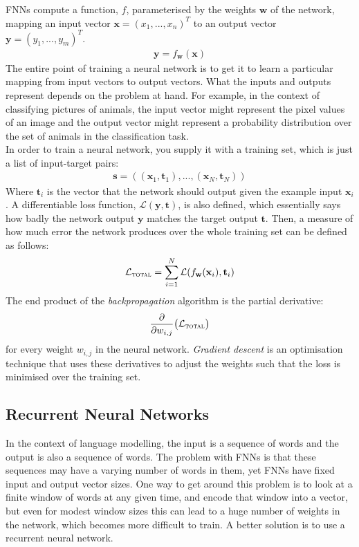 \documentclass[a4paper, 12pt]{report}
\newcommand{\tit}[1]{\textit{#1}}
\begin{document}
FNNs compute a function, $f$, parameterised by the weights $\mathbf{w}$ of the network, mapping an input vector $\mathbf{x} = (x_1, ..., x_n)^T$ to an output vector $\mathbf{y} = (y_1, ..., y_m)^T$. 
\begin{gather*}
	\mathbf{y} = f_\mathbf{w}(\mathbf{x})
\end{gather*}
The entire point of training a neural network is to get it to learn a particular mapping from input vectors to output vectors. What the inputs and outputs represent depends on the problem at hand. For example, in the context of classifying pictures of animals, the input vector might represent the pixel values of an image and the output vector might represent a probability distribution over the set of animals in the classification task. \\

In order to train a neural network, you supply it with a training set, which is just a list of input-target pairs:
\begin{gather*}
	\mathbf{s} = ((\mathbf{x}_1, \mathbf{t}_1), ..., (\mathbf{x}_N, \mathbf{t}_N))
\end{gather*}
Where $\mathbf{t}_i$ is the vector that the network should output given the example input $\mathbf{x}_i$. A differentiable loss function, $\mathcal{L}(\mathbf{y}, \mathbf{t})$, is also defined, which essentially says how badly the network output $\mathbf{y}$ matches the target output $\mathbf{t}$. Then, a measure of how much error the network produces over the whole training set can be defined as follows:
\begin{gather*}
	\mathcal{L}_{\text{\scshape total}} = \sum_{i = 1}^N \mathcal{L}(f_{\mathbf{w}}(\mathbf{x}_i), \mathbf{t}_i)
\end{gather*}
The end product of the \tit{backpropagation} algorithm is the partial derivative:
\begin{gather*}
	\frac{\partial}{\partial w_{i,j}} \big( \mathcal{L}_{\text{\scshape total}} \big)
\end{gather*}
for every weight $w_{i,j}$ in the neural network. \tit{Gradient descent} is an optimisation technique that uses these derivatives to adjust the weights such that the loss is minimised over the training set.

\subsection{Recurrent Neural Networks}

In the context of language modelling, the input is a sequence of words and the output is also a sequence of words. The problem with FNNs is that these sequences may have a varying number of words in them, yet FNNs have fixed input and output vector sizes. One way to get around this problem is to look at a finite window of words at any given time, and encode that window into a vector, but even for modest window sizes this can lead to a huge number of weights in the network, which becomes more difficult to train. A better solution is to use a recurrent neural network. \\
\end{document}
